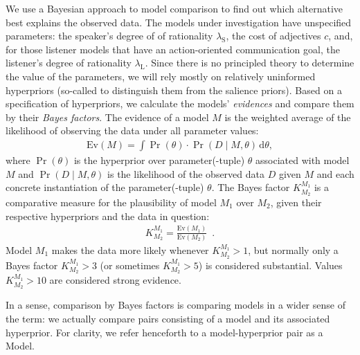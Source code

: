 We use a Bayesian approach to model comparison
\cite{Jeffreys1961:Theory-of-Proba,KassRaftery1995:Bayes-Factors,Jaynes2003:Probability-The,VandekerckhoveMatzke2013:Model-Compariso}
to find out which alternative best explains the observed data. The
models under investigation have unspecified parameters: the speaker's
degree of of rationality $\lambda_\mathrm{S}$, the cost of adjectives
$c$, and, for those listener models that have an action-oriented
communication goal, the listener's degree of rationality
$\lambda_\mathrm{L}$. Since there is no principled theory to determine
the value of the parameters, we will rely mostly on relatively
uninformed hyperpriors (so-called to distinguish them from the
salience priors). Based on a specification of hyperpriors, we
calculate the models' \emph{evidences} and compare them by their
\emph{Bayes factors}. The evidence of a model $M$ is the weighted
average of the likelihood of observing the data under all parameter
values:
\begin{align}
  \label{BMA}
  \mathrm{Ev}(M)= \int \Pr(\theta) \cdot \Pr(D  \mid  M, \theta)\, \mathrm{d}\theta,
\end{align}
where $\Pr(\theta)$ is the hyperprior over parameter(-tuple) $\theta$
associated with model $M$ and $\Pr(D \mid M, \theta)$ is the
likelihood of the observed data $D$ given $M$ and each concrete
instantiation of the parameter(-tuple) $\theta$. The Bayes factor
$K^{M_1}_{M_2}$ is a comparative measure for the plausibility of model
$M_1$ over $M_2$, given their respective hyperpriors and the data in
question:
\begin{align}
  K^{M_1}_{M_2} = \frac{\mathrm{Ev}(M_1)}{\mathrm{Ev}(M_2)} \enspace .
\end{align}
Model $M_1$ makes the data more likely whenever $K^{M_1}_{M_2} > 1$, but
normally only a Bayes factor $K^{M_1}_{M_2} >3$ (or sometimes
$K^{M_1}_{M_2} > 5$) is considered substantial. Values $K^{M_1}_{M_2}
> 10$ are considered strong evidence.

In a sense, comparison by Bayes factors is comparing models in a wider
sense of the term: we actually compare pairs consisting of a model and
its associated hyperprior. For clarity, we refer henceforth to a
model-hyperprior pair as a Model.

